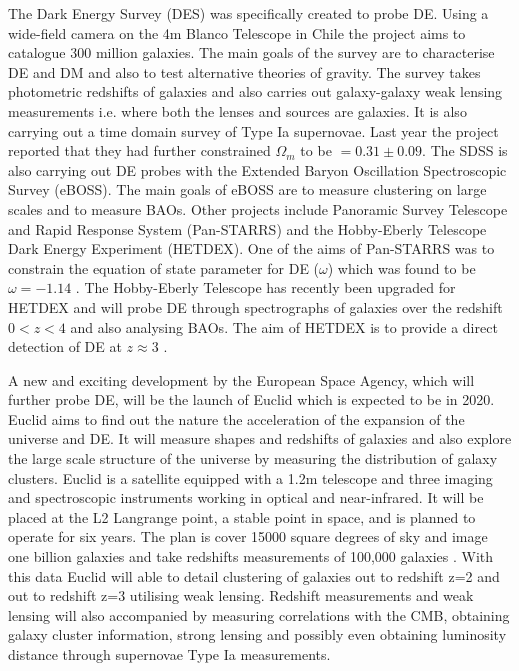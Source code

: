 \documentclass[a4paper,12pt]{article}
\begin{document}
The Dark Energy Survey (DES) was specifically created to probe DE. Using a wide-field camera on the 4m Blanco Telescope in Chile the project aims to catalogue 300 million
galaxies. The main goals of the survey are to characterise DE and DM and also to test alternative theories of gravity. The survey takes photometric redshifts of galaxies and
also carries out galaxy-galaxy weak lensing measurements i.e. where both the lenses and sources are galaxies. It is also carrying out a time domain survey of Type Ia supernovae.
Last year the project reported that they had further constrained $\Omega_m$ to be $=0.31\pm0.09$. The SDSS is also carrying out DE probes with the Extended Baryon Oscillation
Spectroscopic Survey (eBOSS). The main goals of eBOSS are to measure clustering on large scales and to measure BAOs. Other projects include Panoramic Survey Telescope and Rapid 
Response System (Pan-STARRS) and the Hobby-Eberly Telescope Dark Energy Experiment (HETDEX). 
One of the aims of Pan-STARRS was to constrain the equation of state parameter for DE ($\omega$) which was found to be $\omega=-1.14$ \citep{zheng}. The Hobby-Eberly Telescope 
has recently been upgraded for HETDEX and will probe DE through spectrographs of galaxies over the redshift $0<z<4$ and also analysing BAOs. The aim of HETDEX is to provide a
direct detection of DE at $z\approx3$ \citep{hill}.

A new and exciting development by the European Space Agency, which will further probe DE, will be the launch of Euclid which is expected to be in 2020. Euclid aims to find out
the nature the acceleration of the expansion of the universe and DE. It will measure shapes and redshifts of galaxies and also explore the large scale structure of the universe
by measuring the distribution of galaxy clusters. Euclid is a satellite equipped with a 1.2m telescope and three imaging and spectroscopic instruments working in optical and
near-infrared. It will be placed at the L2 Langrange point, a stable point in space, and is planned to operate for six years. The plan is cover 15000 square degrees of sky and
image one billion galaxies and take redshifts measurements of 100,000 galaxies \citep{amendola}. With this data Euclid will able to detail clustering of galaxies out to redshift
z=2 and out to redshift z=3 utilising weak lensing. Redshift measurements and weak lensing will also accompanied by measuring correlations with the CMB, obtaining galaxy cluster 
information, strong lensing and possibly even obtaining luminosity distance through supernovae Type Ia measurements.
\end{document}
